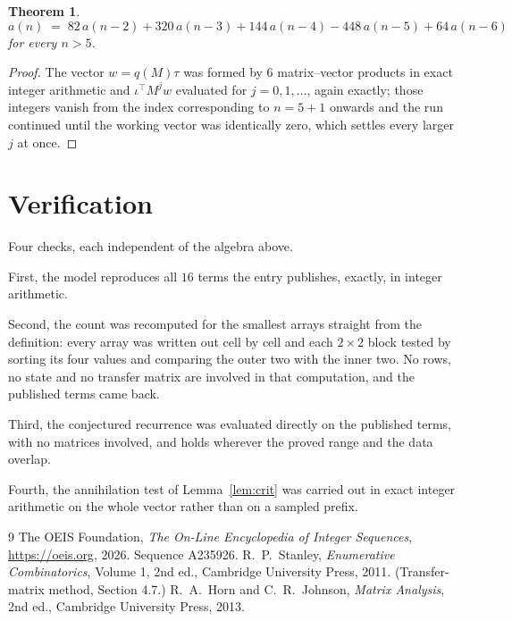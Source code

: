\documentclass[11pt,a4paper]{article}
\theoremstyle{plain}
\newtheorem{theorem}{Theorem}
\theoremstyle{definition}
\begin{document}
\begin{theorem}
\[
a(n)\;=\;82\,a(n-2) + 320\,a(n-3) + 144\,a(n-4) - 448\,a(n-5) + 64\,a(n-6)
\]
for every $n>5$.
\end{theorem}

\begin{proof}
The vector $w=q(M)\tau$ was formed by $6$ matrix--vector products in exact integer
arithmetic and $\iota^{\!\top}M^{j}w$ evaluated for $j=0,1,\dots$, again exactly; those
integers vanish from the index corresponding to $n=5+1$ onwards and the run continued
until the working vector was identically zero, which settles every larger $j$ at once.
\end{proof}

\section{Verification}

Four checks, each independent of the algebra above.

First, the model reproduces all $16$ terms the entry publishes, exactly, in integer
arithmetic.

Second, the count was recomputed for the smallest arrays straight from the definition: every
array was written out cell by cell and each $2\times2$ block tested by sorting its four values
and comparing the outer two with the inner two. No rows, no state and no transfer matrix are
involved in that computation, and the published terms came back.

Third, the conjectured recurrence was evaluated directly on the published terms, with no
matrices involved, and holds wherever the proved range and the data overlap.

Fourth, the annihilation test of Lemma~\ref{lem:crit} was carried out in exact integer
arithmetic on the whole vector rather than on a sampled prefix.

\begin{thebibliography}{9}
 The OEIS Foundation, \emph{The On-Line Encyclopedia of Integer
Sequences}, \url{https://oeis.org}, 2026. Sequence A235926.
 R.~P.~Stanley, \emph{Enumerative Combinatorics}, Volume 1, 2nd ed.,
Cambridge University Press, 2011. (Transfer-matrix method, Section 4.7.)
 R.~A.~Horn and C.~R.~Johnson, \emph{Matrix Analysis}, 2nd ed., Cambridge
University Press, 2013.
\end{thebibliography}
\end{document}
